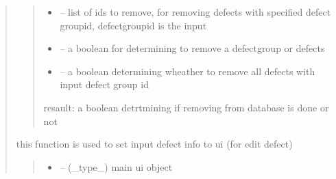 \documentclass[letterpaper,10pt,english]{sphinxmanual}
\begin{document}
\begin{quote}
\begin{savenotes}
\begin{fulllineitems}
\begin{quote}
\begin{description}
\begin{itemize}
\item {} 
\sphinxAtStartPar
{} – list of ids to remove, for removing defects with specified defect group\sphinxhyphen{}id, defect\sphinxhyphen{}group\sphinxhyphen{}id is the input

\item {} 
\sphinxAtStartPar
{} – a boolean for determining to remove a defect\sphinxhyphen{}group or defects

\item {} 
\sphinxAtStartPar
{} – a boolean determining wheather to remove all defects with input defect group id

\end{itemize}

\sphinxAtStartPar
resault: a boolean detrtmining if removing from database is done or not

\end{description}\end{quote}

\end{fulllineitems}\end{savenotes}


\begin{savenotes}\begin{fulllineitems}
\label{\detokenize{setting/backend/defect_management_funcs:oxin.backend.defect_management_funcs.set_defect_group_info_on_ui}}
\pysigstartsignatures
{}
\pysigstopsignatures
\sphinxAtStartPar
this function is used to set input defect info to ui (for edit defect)
\begin{quote}\begin{description}
\begin{itemize}
\item {} 
\sphinxAtStartPar
{} – (\_type\_) main ui object


\end{itemize}
\end{description}
\end{quote}
\end{fulllineitems}
\end{savenotes}
\end{quote}
\end{document}
